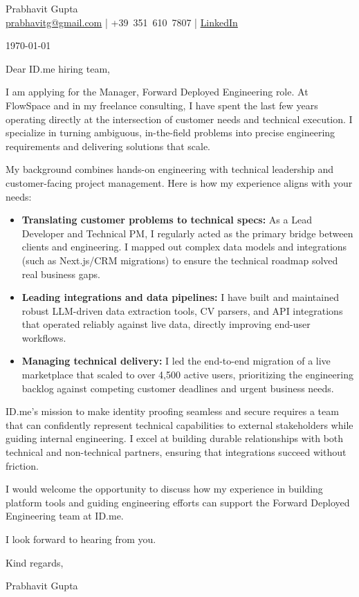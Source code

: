 \documentclass{article}\usepackage{geometry}\geometry{a4paper, margin=1in}\usepackage{hyperref}\newcommand{\namesection}[3]{\begin{center}\Huge #2\\[1ex]\large #3\end{center}\vspace{1cm}}\newcommand{\currentdate}[1]{\begin{flushright}#1\end{flushright}\vspace{0.5cm}}\newcommand{\lettercontent}[1]{#1\vspace{1ex}\par}\newcommand{\closing}[1]{#1\vspace{2cm}\par}\newcommand{\signature}[1]{#1}
\begin{document}
\namesection{}{\Huge{Prabhavit Gupta}}{  \href{mailto:prabhavitg@gmail.com}{prabhavitg@gmail.com} | +39~351~610~7807 |  \urlstyle{same}\href{https://www.linkedin.com/in/prabhavit/}{LinkedIn}
}


\currentdate{\today}
\lettercontent{Dear ID.me hiring team,}

\lettercontent{I am applying for the Manager, Forward Deployed Engineering role. At FlowSpace and in my freelance consulting, I have spent the last few years operating directly at the intersection of customer needs and technical execution. I specialize in turning ambiguous, in-the-field problems into precise engineering requirements and delivering solutions that scale.}

\lettercontent{My background combines hands-on engineering with technical leadership and customer-facing project management. Here is how my experience aligns with your needs:}

{\raggedright\fontsize{11pt}{13pt}\selectfont
\begin{itemize}
    \item \textbf{Translating customer problems to technical specs:} As a Lead Developer and Technical PM, I regularly acted as the primary bridge between clients and engineering. I mapped out complex data models and integrations (such as Next.js/CRM migrations) to ensure the technical roadmap solved real business gaps.
    \item \textbf{Leading integrations and data pipelines:} I have built and maintained robust LLM-driven data extraction tools, CV parsers, and API integrations that operated reliably against live data, directly improving end-user workflows.
    \item \textbf{Managing technical delivery:} I led the end-to-end migration of a live marketplace that scaled to over 4,500 active users, prioritizing the engineering backlog against competing customer deadlines and urgent business needs.
\end{itemize}\par}
\vspace{6pt}

\lettercontent{ID.me's mission to make identity proofing seamless and secure requires a team that can confidently represent technical capabilities to external stakeholders while guiding internal engineering. I excel at building durable relationships with both technical and non-technical partners, ensuring that integrations succeed without friction.}

\lettercontent{I would welcome the opportunity to discuss how my experience in building platform tools and guiding engineering efforts can support the Forward Deployed Engineering team at ID.me.}

\lettercontent{I look forward to hearing from you.}

\begin{flushright}
\closing{Kind regards,}

\signature{Prabhavit Gupta}
\end{flushright}
\end{document}
